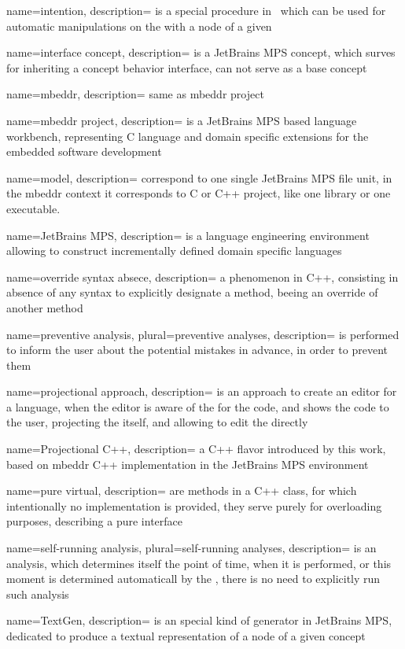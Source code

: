 {
  name=intention,
  description={ is a special procedure in \jbmps\ which can be used for automatic manipulations on the  with a node of a given }
}

{
  name=interface concept,
  description={ is a JetBrains MPS concept, which surves for inheriting a concept behavior interface, can not serve as a base concept}
}


{
  name=mbeddr,
  description={ same as mbeddr project}
}


{
  name=mbeddr project,
  description={ is a JetBrains MPS based language workbench, representing C language and domain specific
  extensions for the embedded software development}
}

{
  name=model,
  description={ correspond to one single JetBrains MPS file unit, in the mbeddr context it corresponds to C or C++ project, like one library or one executable.}
}

{
  name=JetBrains MPS,
  description={ is a language engineering environment 
  allowing to construct incrementally defined domain specific languages}
}

{
  name=override syntax absece,
  description={ a phenomenon in C++, consisting in absence of any syntax to explicitly designate a method, beeing an override
  of another method}
}


{
  name=preventive analysis,
  plural=preventive analyses,
  description={ is performed to inform the user about the potential mistakes in advance, in order to prevent them}
}

{
  name=projectional approach,
  description={ is an approach to create an editor for a language, when the editor is 
  aware of the  for the code, and shows the code to the user, projecting the 
   itself, and allowing to edit the  directly}
}

{
  name=Projectional C++,
  description={ a C++ flavor introduced by this work, based on mbeddr C++ implementation in the JetBrains MPS environment}
}

{
  name=pure virtual,
  description={ are methods in a C++ class, for which intentionally no implementation is provided, they serve purely for overloading purposes, 
  describing a pure interface}
}


{
  name=self-running analysis,
  plural=self-running analyses,
  description={ is an analysis, which determines itself the point of time, when it is performed, or this moment is determined automaticall by the , 
  there is no need to explicitly run such analysis}
}


{
  name=TextGen,
  description={ is an special kind of generator in JetBrains MPS, dedicated to produce a textual representation of a node of a given concept}
}
